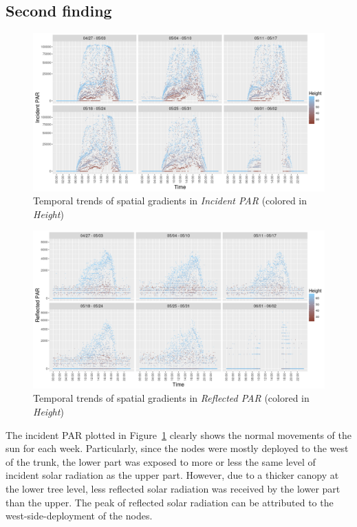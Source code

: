 \documentclass[11pt]{article}
\begin{document}
\subsection{Second finding}
\label{subsec:secondFind}
\begin{figure}[!h]
  \centering
    \includegraphics[width=.9\textwidth, height=.42\textwidth]{../figures/iparTemporal.png}
  \caption{Temporal trends of spatial gradients in \textit{Incident PAR} (colored in \textit{Height})}
  \label{fig:iparTemporal}
\end{figure}
\begin{figure}[!h]
  \centering
    \includegraphics[width=.9\textwidth, height=.42\textwidth]{../figures/rparTemporal.png}
  \caption{Temporal trends of spatial gradients in \textit{Reflected PAR} (colored in \textit{Height})}
  \label{fig:rparTemporal}
\end{figure}
The incident PAR plotted in Figure~\ref{fig:iparTemporal} clearly shows the normal movements of the sun for each week. Particularly, since the nodes were mostly deployed to the west of the trunk, the lower part was exposed to more or less the same level of incident solar radiation as the upper part. However, due to a thicker canopy at the lower tree level, less reflected solar radiation was received by the lower part than the upper. The peak of reflected solar radiation can be attributed to the west-side-deployment of the nodes.
\end{document}
